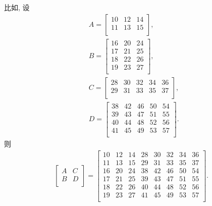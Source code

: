 \documentclass[../libro.tex]{subfiles}
\begin{document}
比如, 设
\begin{align*}
    &
    A =
    \begin{bmatrix}
        10 & 12 & 14 \\
        11 & 13 & 15 \\
    \end{bmatrix},
    \\
    &
    B =
    \begin{bmatrix}
        16 & 20 & 24 \\
        17 & 21 & 25 \\
        18 & 22 & 26 \\
        19 & 23 & 27 \\
    \end{bmatrix},
    \\
    &
    C =
    \begin{bmatrix}
        28 & 30 & 32 & 34 & 36 \\
        29 & 31 & 33 & 35 & 37 \\
    \end{bmatrix},
    \\
    &
    D =
    \begin{bmatrix}
        38 & 42 & 46 & 50 & 54 \\
        39 & 43 & 47 & 51 & 55 \\
        40 & 44 & 48 & 52 & 56 \\
        41 & 45 & 49 & 53 & 57 \\
    \end{bmatrix}.
\end{align*}
则
\begin{align*}
    \begin{bmatrix}
        A & C \\
        B & D \\
    \end{bmatrix}
    =
    \begin{bmatrix}
        10 & 12 & 14 & 28 & 30 & 32 & 34 & 36 \\
        11 & 13 & 15 & 29 & 31 & 33 & 35 & 37 \\
        16 & 20 & 24 & 38 & 42 & 46 & 50 & 54 \\
        17 & 21 & 25 & 39 & 43 & 47 & 51 & 55 \\
        18 & 22 & 26 & 40 & 44 & 48 & 52 & 56 \\
        19 & 23 & 27 & 41 & 45 & 49 & 53 & 57 \\
    \end{bmatrix}.
\end{align*}
\end{document}
